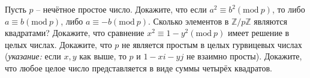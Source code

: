 \documentclass[a4paper, 12pt]{article}
\begin{document}
	 Пусть $p$ -- нечётное простое число. Докажите, что если $a^2 \equiv b^2 (\mathrm{mod} \ p)$, то либо $a \equiv b (\mathrm{mod} \ p)$, либо $a \equiv -b (\mathrm{mod} \ p)$. Сколько элементов в $\mathbb{Z}/p\mathbb{Z}$ являются квадратами?  Докажите, что сравнение  $x^2 \equiv 1-y^2 (\mathrm{mod} \ p)$ имеет решение в целых числах.  Докажите, что $p$ не является простым в целых гурвицевых числах (\emph{указание:} если $x,y$ как выше, то $p$ и $1-xi-yj$ не взаимно просты).  Докажите, что любое целое число представляется в виде суммы четырёх квадратов.





\end{document}
